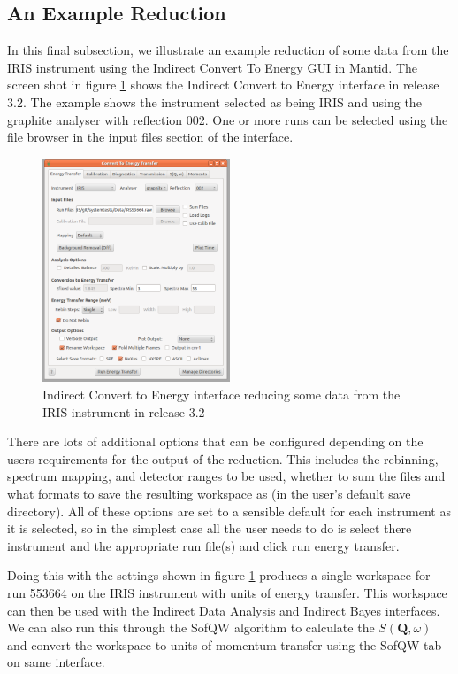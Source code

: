 \documentclass[paper=a4, fontsize=11pt]{scrartcl}	%
\numberwithin{equation}{section}															%
\numberwithin{figure}{section}																%
\numberwithin{table}{section}																%
\begin{document}
\subsection{An Example Reduction}
In this final subsection, we illustrate an example reduction of some data from the IRIS instrument using the Indirect Convert To Energy GUI in Mantid. The screen shot in figure \ref{fig:iris-c2e-reduction} shows the Indirect Convert to Energy interface in release 3.2. The example shows the instrument selected as being IRIS and using the graphite analyser with reflection 002. One or more runs can be selected using the file browser in the input files section of the interface.

\begin{figure}[H]
\centering
\includegraphics[width=0.5\textwidth]{img/iris-c2e-reduction.png}
\caption{Indirect Convert to Energy interface reducing some data from the IRIS instrument in release 3.2}
\label{fig:iris-c2e-reduction}
\end{figure}

There are lots of additional options that can be configured depending on the users requirements for the output of the reduction. This includes the rebinning, spectrum mapping, and detector ranges to be used, whether to sum the files and what formats to save the resulting workspace as (in the user's default save directory). All of these options are set to a sensible default for each instrument as it is selected, so in the simplest case all the user needs to do is select there instrument and the appropriate run file(s) and click run energy transfer.

Doing this with the settings shown in figure \ref{fig:iris-c2e-reduction} produces a single workspace for run 553664 on the IRIS instrument with units of energy transfer. This workspace can then be used with the Indirect Data Analysis and Indirect Bayes interfaces. We can also run this through the SofQW algorithm to calculate the $S(\mathbf{Q},\omega)$ and convert the workspace to units of momentum transfer using the SofQW tab on same interface.
\end{document}
